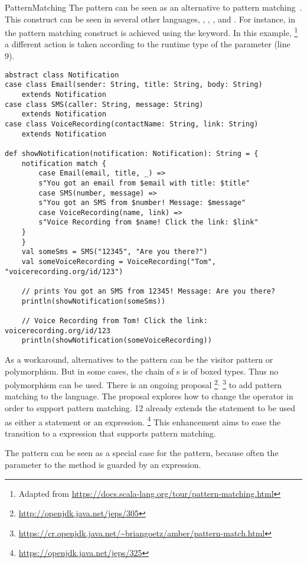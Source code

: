 \begin{pattern}{PatternMatching}
The \thisp{} pattern can be seen as an \adhoc{} alternative to pattern matching~\citep{lavilleLazyPatternMatching1987}.
This construct can be seen in several other languages, \eg, \scala{}, \csharp{}, and \haskell{}.
For instance, in \scala{} the pattern matching construct is achieved using the  keyword.
In this example,%
\footnote{Adapted from \url{https://docs.scala-lang.org/tour/pattern-matching.html}}
a different action is taken according to the runtime type of the parameter  (line 9).

\begin{verbatim}
abstract class Notification
case class Email(sender: String, title: String, body: String)
	extends Notification
case class SMS(caller: String, message: String)
	extends Notification
case class VoiceRecording(contactName: String, link: String)
	extends Notification

def showNotification(notification: Notification): String = {
	notification match {
		case Email(email, title, _) =>
		s"You got an email from $email with title: $title"
		case SMS(number, message) =>
		s"You got an SMS from $number! Message: $message"
		case VoiceRecording(name, link) =>
		s"Voice Recording from $name! Click the link: $link"
	}
	}
	val someSms = SMS("12345", "Are you there?")
	val someVoiceRecording = VoiceRecording("Tom", "voicerecording.org/id/123")
	
	// prints You got an SMS from 12345! Message: Are you there?
	println(showNotification(someSms))
	
	// Voice Recording from Tom! Click the link: voicerecording.org/id/123	
	println(showNotification(someVoiceRecording))
\end{verbatim}

As a workaround, alternatives to the \thisp{} pattern can be the visitor pattern or polymorphism.
But in some cases, the chain of s is of boxed types.
Thus no polymorphism can be used.
There is an ongoing proposal%
\footnote{\url{http://openjdk.java.net/jeps/305}}$^{,}$%
\footnote{\url{https://cr.openjdk.java.net/~briangoetz/amber/pattern-match.html}}
to add pattern matching to the \java{} language.
The proposal explores how to change the  operator in order to support pattern matching.
\java{} 12 already extends the  statement to be used as either a statement or an expression.%
\footnote{\url{https://openjdk.java.net/jeps/325}}
This enhancement aims to ease the transition to a  expression that supports pattern matching.

\related{}
The  pattern can be seen as a special case for the \thisp{} pattern,
because often the parameter to the  method is guarded by an  expression.
\end{pattern}
